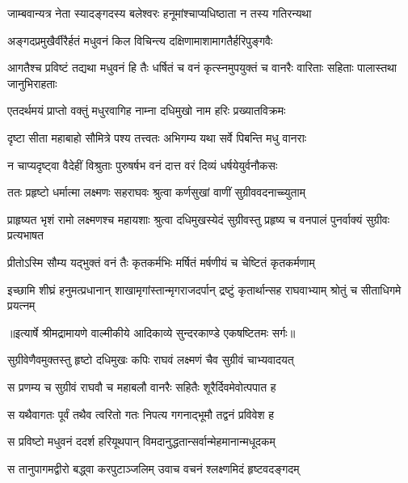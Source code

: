 \twolineshloka
{जाम्बवान्यत्र नेता स्यादङ्गदस्य बलेश्वरः}
{हनूमांश्चाप्यधिष्ठाता न तस्य गतिरन्यथा} %

\twolineshloka
{अङ्गदप्रमुखैर्वीरैर्हतं मधुवनं किल}
{विचिन्त्य दक्षिणामाशामागतैर्हरिपुङ्गवैः} %

\threelineshloka
{आगतैश्च प्रविष्टं तद्यथा मधुवनं हि तैः}
{धर्षितं च वनं कृत्स्नमुपयुक्तं च वानरैः}
{वारिताः सहिताः पालास्तथा जानुभिराहताः} %

\twolineshloka
{एतदर्थमयं प्राप्तो वक्तुं मधुरवागिह}
{नाम्ना दधिमुखो नाम हरिः प्रख्यातविक्रमः} %

\twolineshloka
{दृष्टा सीता महाबाहो सौमित्रे पश्य तत्त्वतः}
{अभिगम्य यथा सर्वे पिबन्ति मधु वानराः} %

\twolineshloka
{न चाप्यदृष्ट्वा वैदेहीं विश्रुताः पुरुषर्षभ}
{वनं दात्त वरं दिव्यं धर्षयेयुर्वनौकसः} %

\twolineshloka
{ततः प्रहृष्टो धर्मात्मा लक्ष्मणः सहराघवः}
{श्रुत्वा कर्णसुखां वाणीं सुग्रीववदनाच्च्युताम्} %

\threelineshloka
{प्राहृष्यत भृशं रामो लक्ष्मणश्च महायशाः}
{श्रुत्वा दधिमुखस्येदं सुग्रीवस्तु प्रहृष्य च}
{वनपालं पुनर्वाक्यं सुग्रीवः प्रत्यभाषत} %

\twolineshloka
{प्रीतोऽस्मि सौम्य यद्भुक्तं वनं तैः कृतकर्मभिः}
{मर्षितं मर्षणीयं च चेष्टितं कृतकर्मणाम्} %

\fourlineindentedshloka
{इच्छामि शीघ्रं हनुमत्प्रधानान्}
{शाखामृगांस्तान्मृगराजदर्पान्}
{द्रष्टुं कृतार्थान्सह राघवाभ्याम्}
{श्रोतुं च सीताधिगमे प्रयत्नम्} %


{॥इत्यार्षे श्रीमद्रामायणे वाल्मीकीये आदिकाव्ये सुन्दरकाण्डे एकषष्टितमः सर्गः॥}


\twolineshloka
{सुग्रीवेणैवमुक्तस्तु हृष्टो दधिमुखः कपिः}
{राघवं लक्ष्मणं चैव सुग्रीवं चाभ्यवादयत्} %

\twolineshloka
{स प्रणम्य च सुग्रीवं राघवौ च महाबलौ}
{वानरैः सहितैः शूरैर्दिवमेवोत्पपात ह} %

\twolineshloka
{स यथैवागतः पूर्वं तथैव त्वरितो गतः}
{निपत्य गगनाद्भूमौ तद्वनं प्रविवेश ह} %

\twolineshloka
{स प्रविष्टो मधुवनं ददर्श हरियूथपान्}
{विमदानुद्धतान्सर्वान्मेहमानान्मधूदकम्} %

\twolineshloka
{स तानुपागमद्वीरो बद्ध्वा करपुटाञ्जलिम्}
{उवाच वचनं श्लक्ष्णमिदं हृष्टवदङ्गदम्} %

